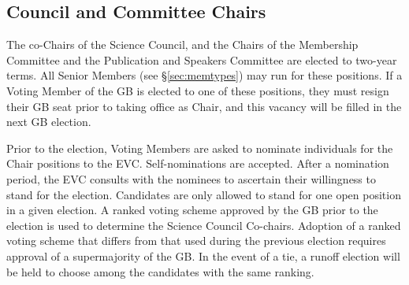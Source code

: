 \documentclass[12pt]{article}
\begin{document}


\subsection{Council and Committee Chairs}
The co-Chairs of the Science Council, and the Chairs of the Membership Committee and the Publication and Speakers Committee are elected to two-year terms. All Senior Members (see \S\ref{sec:memtypes}) may  run for these positions.  If a Voting Member of the GB is elected to one of these positions, they must resign their GB seat prior to taking office as Chair, and this vacancy will be filled in the next GB election. 

Prior to the election, Voting Members are asked to nominate individuals for the Chair positions to the EVC.   Self-nominations are accepted.
After a nomination period, the EVC consults with the nominees to ascertain their willingness to stand for the election. \textcolor{\markcolor}{Candidates are only allowed to stand for one open position in a given election.  
A ranked voting scheme approved by the GB prior to the election %
is used to determine the Science Council Co-chairs. Adoption of a ranked voting scheme that differs from that used during the previous election requires approval of a supermajority of the GB. 
In the event of a tie, a runoff election will be held  to choose among the candidates with the same ranking. }
\end{document}
